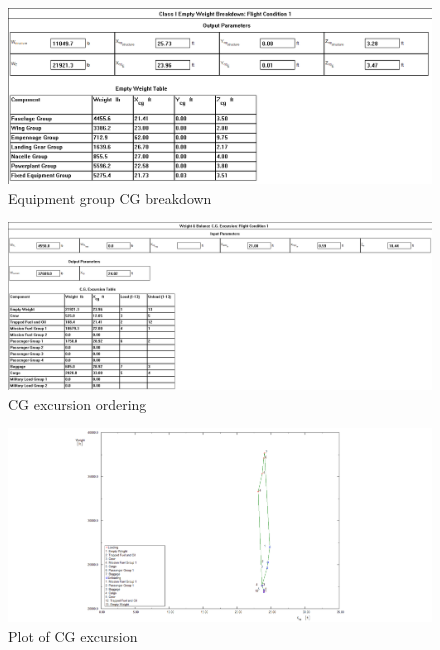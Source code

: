 \documentclass[conf]{new-aiaa}
\begin{document}
\begin{figure}
    \includegraphics[width=\textwidth]{Report3Printouts/Cg/Cg_Empty_Fractions_cropped.png}
    \caption{Equipment group CG breakdown}
    \label{fig:cg_empty_fractions}
\end{figure}


\begin{figure}
    \includegraphics[width=\textwidth]{Report3Printouts/Cg/Cg_Excursion_cropped.png}
    \caption{CG excursion ordering}
    \label{fig:cg_excursion}
\end{figure}

\begin{figure}
    \includegraphics[width=\textwidth]{Report3Printouts/Cg/Cg_Excursion_Plot_cropped.png}
    \caption{Plot of CG excursion}
    \label{fig:cg_excursion_plot}
\end{figure}
\end{document}
